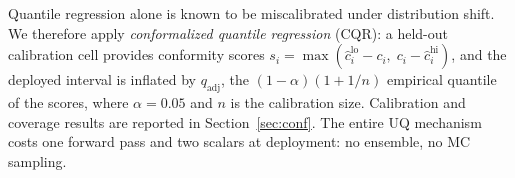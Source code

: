 Quantile regression alone is known to be miscalibrated under
distribution shift. We therefore apply \emph{conformalized quantile
regression} (CQR): a held-out calibration cell provides conformity
scores $s_i = \max(\hat{c}_i^{\text{lo}} - c_i,\; c_i -
\hat{c}_i^{\text{hi}})$, and the deployed interval is inflated by
$q_{\text{adj}}$, the $(1-\alpha)(1+1/n)$ empirical quantile of the
scores, where $\alpha = 0.05$ and $n$ is the calibration size.
Calibration and coverage results are reported in
Section~\ref{sec:conf}. The entire UQ mechanism costs one forward
pass and two scalars at deployment: no ensemble, no MC sampling.

